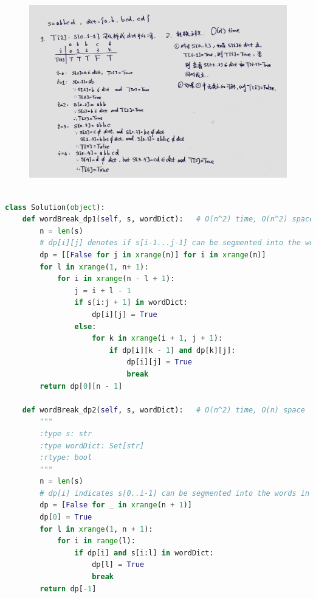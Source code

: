 \documentclass[a4paper,10pt]{article}
\begin{document}
\begin{figure}[h]
\includegraphics[width=\textwidth]{leetcode139.jpg}
\centering \\
\end{figure}

\begin{lstlisting}[language=Python, caption=Problem139. Word Break]

class Solution(object):
    def wordBreak_dp1(self, s, wordDict):   # O(n^2) time, O(n^2) space
        n = len(s)
        # dp[i][j] denotes if s[i-1...j-1] can be segmented into the words in wordDict
        dp = [[False for j in xrange(n)] for i in xrange(n)]
        for l in xrange(1, n+ 1):
            for i in xrange(n - l + 1):
                j = i + l - 1
                if s[i:j + 1] in wordDict:
                    dp[i][j] = True
                else:
                    for k in xrange(i + 1, j + 1):
                        if dp[i][k - 1] and dp[k][j]:
                            dp[i][j] = True
                            break
        return dp[0][n - 1]

    def wordBreak_dp2(self, s, wordDict):   # O(n^2) time, O(n) space
        """
        :type s: str
        :type wordDict: Set[str]
        :rtype: bool
        """
        n = len(s)
        # dp[i] indicates s[0..i-1] can be segmented into the words in wordDict
        dp = [False for _ in xrange(n + 1)]
        dp[0] = True
        for l in xrange(1, n + 1):
            for i in range(l):
                if dp[i] and s[i:l] in wordDict:
                    dp[l] = True
                    break
        return dp[-1]
\end{lstlisting}
\end{document}
